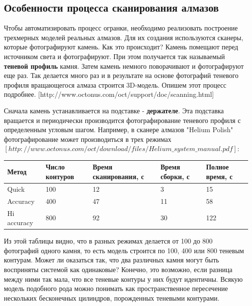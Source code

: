 \documentclass[a4paper,12pt, titlepage]{article}
\begin{document}
\subsection{Особенности процесса сканирования алмазов}
\begin{flushleft}
Чтобы автоматизировать процесс огранки, необходимо реализовать построение трехмерных моделей
реальных алмазов. Для их создания используются сканеры, которые фотографируют камень. 
Как это происходит? Камень помещают перед источником света и фотографируют. При этом получается
так называемый \textbf{теневой профиль} камня. Затем камень немного поворачивают и фотографируют 
еще раз. Так делается много раз и в результате на основе фотографий теневого профиля вращающегося
алмаза строится 3D-модель. Опишем этот процесс подробнее.
[http://www.octonus.com/oct/support/doc/scanning.html] 
\end{flushleft}
\begin{flushleft}
 Сначала камень устанавливается на подставке - \textbf{держателе}. Эта подставка вращается и 
периодически производится фотографирование теневого профиля с определенным угловым шагом. Например, в 
сканере алмазов "Helium Polish" фотографирование может производиться в трех режимах 
$[http://www.octonus.com/oct/download/files/Helium\_system\_manual.pdf]$:
\end{flushleft}
\begin{flushleft}
 \begin{tabular}{|p{2.5cm}|p{2.5cm}|p{2.5cm}|p{2.5cm}|p{2.5cm}|}
  \hline
  Метод & Число контуров & Время сканирования, с & Время сборки, с & Полное время, с  \\
  \hline
  Quick & 100 & 12 & 3 & 15 \\
  \hline
  Accuracy & 400 & 47 & 11 & 58 \\
  \hline
  Hi accuracy & 800 & 92 & 30 & 122 \\
  \hline
 \end{tabular}
\end{flushleft}
\begin{flushleft}
 Из этой таблицы видно, что в разных режимах делается от 100 до 800 фотографий одного камня, то есть
модель строится по 100, 400 или 800 теневым контурам. Может ли оказаться так, что два различных камня 
могут быть восприняты системой как одинаковые? Конечно, это возможно, если разница между ними так мала,
что все теневые контуры у них будут идентичны. Всякую модель подобного рода можно понимать как 
пространственное пересечение нескольких бесконечных цилиндров, порожденных теневыми контурами.
\end{flushleft}
\end{document}
